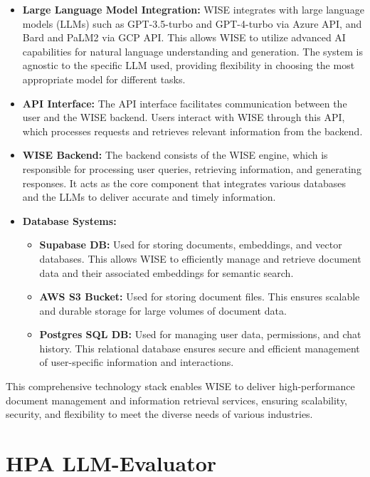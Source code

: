 \begin{itemize}
    \item \textbf{Large Language Model Integration:} WISE integrates with large language models (LLMs) such as GPT-3.5-turbo and GPT-4-turbo via Azure API, and Bard and PaLM2 via GCP API. This allows WISE to utilize advanced AI capabilities for natural language understanding and generation. The system is agnostic to the specific LLM used, providing flexibility in choosing the most appropriate model for different tasks.

    \item \textbf{API Interface:} The API interface facilitates communication between the user and the WISE backend. Users interact with WISE through this API, which processes requests and retrieves relevant information from the backend.

    \item \textbf{WISE Backend:} The backend consists of the WISE engine, which is responsible for processing user queries, retrieving information, and generating responses. It acts as the core component that integrates various databases and the LLMs to deliver accurate and timely information.

    \item \textbf{Database Systems:} 
    \begin{itemize}
        \item \textbf{Supabase DB:} Used for storing documents, embeddings, and vector databases. This allows WISE to efficiently manage and retrieve document data and their associated embeddings for semantic search.
        \item \textbf{AWS S3 Bucket:} Used for storing document files. This ensures scalable and durable storage for large volumes of document data.
        \item \textbf{Postgres SQL DB:} Used for managing user data, permissions, and chat history. This relational database ensures secure and efficient management of user-specific information and interactions.
    \end{itemize}
\end{itemize}

This comprehensive technology stack enables WISE to deliver high-performance document management and information retrieval services, ensuring scalability, security, and flexibility to meet the diverse needs of various industries. \cite{hpa2024}


\section{HPA LLM-Evaluator}

